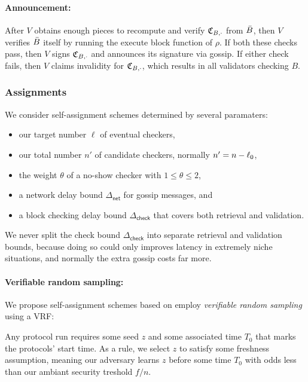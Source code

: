 \smallskip
\paragraph{Announcement:}

After $V$ obtains enough pieces to recompute and verify $\mathfrak{C}_{B,\cdot}$ from $\bar{B}$, then $V$ verifies $\bar{B}$ itself by running the execute block function of $\rho$.  If both these checks pass, then $V$ signs $\mathfrak{C}_{B,\cdot}$ and announces its signature via gossip.  If either check fails, then $V$ claims invalidity for $\mathfrak{C}_{B,\cdot}$, which results in all validators checking $B$.

\subsubsection{Assignments}

\newcommand\netdelay{\ensuremath{\Delta_{\mathsf{net}}}}
\newcommand\checkdelay{\ensuremath{\Delta_{\mathsf{check}}}}

We consider self-assignment schemes determined by several paramaters:
\begin{itemize}
\item our target number $\ell$ of eventual checkers,
\item our total number $n'$ of candidate checkers, normally $n' = n - \ell_0$,
\item the weight $\theta$ of a no-show checker with $1 \leq \theta \leq 2$,
\item a network delay bound $\netdelay$ for gossip messages, and
\item a block checking delay bound $\checkdelay$ that covers both retrieval and validation.
\end{itemize}
We never split the check bound $\checkdelay$ into separate retrieval and validation bounds, because doing so could only improves latency in extremely niche situations, and normally the extra gossip costs far more. 

\paragraph{Verifiable random sampling:}

We propose self-assignment schemes based on employ {\em verifiable random sampling} using a VRF:  

Any protocol run requires some seed $z$ and some associated time $T_0$ that marks the protocols' start time.  As a rule, we select $z$ to satisfy some freshness assumption, meaning our adversary learns $z$ before some time $T_0$ with odds less than our ambiant security treshold $f/n$.

